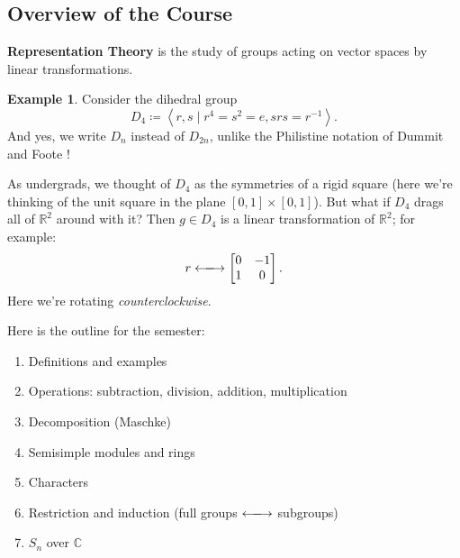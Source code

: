 \documentclass[12pt]{article}
\newcommand{\cx}{\mathbb{C}}
\newcommand{\real}{\mathbb{R}}
\newcommand{\ita}[1]{\textit{#1}}
\newcommand{\vbrack}[1]{\left \langle #1 \right \rangle}
\theoremstyle{definition}
\newtheorem{example}{Example}[section]
\begin{document}
\subsection{Overview of the Course}
\textbf{Representation Theory} is the study of groups acting on vector spaces by linear transformations.
\begin{example}
    Consider the dihedral group 
    \begin{equation}
        D_4\coloneqq \vbrack{r,s\mid r^4=s^2=e,srs=r^{-1}}.
    \end{equation}
    And yes, we write $D_n$ instead of $D_{2n}$, unlike the Philistine notation of Dummit and Foote \cite{Dummit}!
    
    As undergrads, we thought of $D_4$ as the symmetries of a rigid square (here we're thinking of the unit square in the plane $[0,1]\times[0,1]$). But what if $D_4$ drags all of $\real^2$ around with it? Then $g\in D_4$ is a linear transformation of $\real^2$; for example:
    \begin{equation}
        r\xlongleftrightarrow{}
        \begin{bmatrix}
            0 & -1 \\
            1 & 0
        \end{bmatrix}.
    \end{equation}
    Here we're rotating \ita{counterclockwise}.
\end{example}
Here is the outline for the semester:
\begin{enumerate}
    \item Definitions and examples
    \item Operations: subtraction, division, addition, multiplication
    \item Decomposition (Maschke)
    \item Semisimple modules and rings
    \item Characters
    \item Restriction and induction (full groups $\xlongleftrightarrow{}$ subgroups)
    \item $S_n$ over $\cx$
\end{enumerate}
\end{document}
